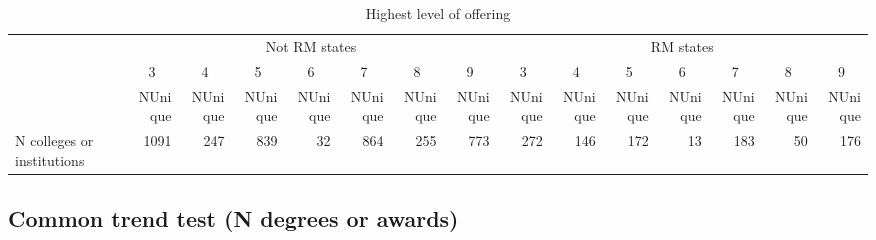 \documentclass[
  landscape]{article}
\begin{document}
\text{ }
\begin{table}

\caption{\label{tab:unnamed-chunk-3}Highest level of offering}
\centering
\begin{tabular}[t]{lrrrrrrrrrrrrrr}
\toprule
\multicolumn{1}{c}{ } & \multicolumn{7}{c}{Not RM states} & \multicolumn{7}{c}{RM states} \\
\cmidrule(l{3pt}r{3pt}){2-8} \cmidrule(l{3pt}r{3pt}){9-15}
\multicolumn{1}{c}{ } & \multicolumn{1}{c}{3} & \multicolumn{1}{c}{4} & \multicolumn{1}{c}{5} & \multicolumn{1}{c}{6} & \multicolumn{1}{c}{7} & \multicolumn{1}{c}{8} & \multicolumn{1}{c}{9} & \multicolumn{1}{c}{3} & \multicolumn{1}{c}{4} & \multicolumn{1}{c}{5} & \multicolumn{1}{c}{6} & \multicolumn{1}{c}{7} & \multicolumn{1}{c}{8} & \multicolumn{1}{c}{9} \\
\cmidrule(l{3pt}r{3pt}){2-2} \cmidrule(l{3pt}r{3pt}){3-3} \cmidrule(l{3pt}r{3pt}){4-4} \cmidrule(l{3pt}r{3pt}){5-5} \cmidrule(l{3pt}r{3pt}){6-6} \cmidrule(l{3pt}r{3pt}){7-7} \cmidrule(l{3pt}r{3pt}){8-8} \cmidrule(l{3pt}r{3pt}){9-9} \cmidrule(l{3pt}r{3pt}){10-10} \cmidrule(l{3pt}r{3pt}){11-11} \cmidrule(l{3pt}r{3pt}){12-12} \cmidrule(l{3pt}r{3pt}){13-13} \cmidrule(l{3pt}r{3pt}){14-14} \cmidrule(l{3pt}r{3pt}){15-15}
  & NUnique & NUnique  & NUnique   & NUnique    & NUnique     & NUnique      & NUnique       & NUnique        & NUnique         & NUnique          & NUnique           & NUnique            & NUnique             & NUnique             \\
\midrule
N colleges or institutions & 1091 & 247 & 839 & 32 & 864 & 255 & 773 & 272 & 146 & 172 & 13 & 183 & 50 & 176\\
\bottomrule
\end{tabular}
\end{table}

\text{ }

\newpage

\hypertarget{common-trend-test-n-degrees-or-awards}{%
\subsection{Common trend test (N degrees or
awards)}\label{common-trend-test-n-degrees-or-awards}}
\end{document}
